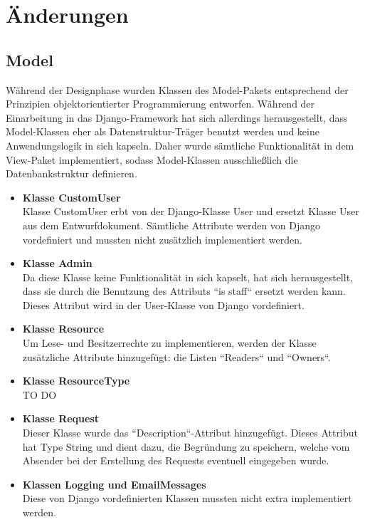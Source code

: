 \documentclass[parskip=full,11pt]{scrartcl}
\begin{document}
 \newpage
 \section{Änderungen}
 
 \subsection{Model}
Während der Designphase wurden Klassen des Model-Pakets entsprechend der Prinzipien objektorientierter Programmierung entworfen. Während der Einarbeitung in das Django-Framework hat sich allerdings herausgestellt, dass Model-Klassen eher als Datenstruktur-Träger benutzt werden und keine Anwendungslogik in sich kapseln. Daher wurde sämtliche Funktionalität in dem View-Paket implementiert, sodass Model-Klassen ausschließlich die Datenbankstruktur definieren.
 
\begin{itemize}
\item \textbf{Klasse CustomUser}\\
Klasse CustomUser erbt von der Django-Klasse User und ersetzt Klasse User aus dem Entwurfdokument. Sämtliche Attribute werden von Django vordefiniert und mussten nicht zusätzlich implementiert werden.

\item \textbf{Klasse Admin}\\
Da diese Klasse keine Funktionalität in sich kapselt, hat sich herausgestellt, dass sie durch die Benutzung des Attributs ``is staff`` ersetzt werden kann. Dieses Attribut wird in der User-Klasse von Django vordefiniert.
 
\item\textbf{Klasse Resource}\\
Um Lese- und Besitzerrechte zu implementieren, werden der Klasse zusätzliche Attribute hinzugefügt: die Listen ``Readers`` und ``Owners``.

\item \textbf{Klasse ResourceType}\\
TO DO

\item \textbf{Klasse Request}\\
Dieser Klasse wurde das ``Description``-Attribut hinzugefügt. Dieses Attribut hat Type String und dient dazu, die Begründung zu speichern, welche vom Absender bei der Erstellung des Requests eventuell eingegeben wurde.

\item \textbf{Klassen Logging und EmailMessages}\\
Diese von Django vordefinierten Klassen mussten nicht extra implementiert werden. 
\end{itemize}
\end{document}
